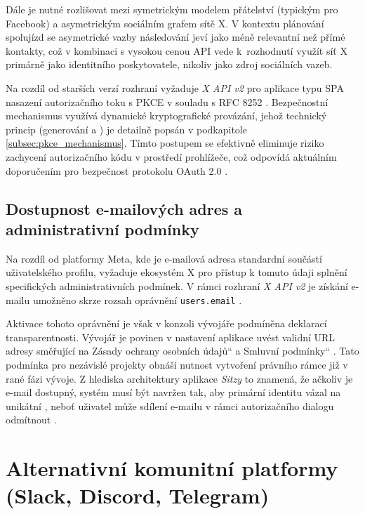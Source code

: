 \documentclass[male,czech,api_bc]{kitheses}
\newcommand{\UV}[1]{\quotedblbase#1\textquotedblleft}
\begin{document}
Dále je nutné rozlišovat mezi symetrickým modelem přátelství (typickým pro Facebook) a asymetrickým sociálním grafem sítě X. V kontextu plánování spolujízd se asymetrické vazby následování jeví jako méně relevantní než přímé kontakty, což v kombinaci s vysokou cenou API vede k~rozhodnutí využít síť X primárně jako identitního poskytovatele, nikoliv jako zdroj sociálních vazeb.

Na rozdíl od starších verzí rozhraní vyžaduje \textit{X API v2} pro aplikace typu SPA nasazení autorizačního toku s PKCE v souladu s RFC 8252 \cite{Denniss2017}. Bezpečnostní mechanismus využívá dynamické kryptografické provázání, jehož technický princip (generování  a ) je detailně popsán v podkapitole \vref{subsec:pkce_mechanismus}. Tímto postupem se efektivně eliminuje riziko zachycení autorizačního kódu v prostředí prohlížeče, což odpovídá aktuálním doporučením pro bezpečnost protokolu OAuth 2.0 \cite{SakimuraEd2015,Lodderstedt2025}.

\subsection{Dostupnost e-mailových adres a administrativní podmínky}

Na rozdíl od platformy Meta, kde je e-mailová adresa standardní součástí uživatelského profilu, vyžaduje ekosystém X pro přístup k tomuto údaji splnění specifických administrativních podmínek. V rámci rozhraní \textit{X API v2} je získání e-mailu umožněno skrze rozsah oprávnění \texttt{users.email} \cite{XDev2026}.

Aktivace tohoto oprávnění je však v konzoli vývojáře podmíněna deklarací transparentnosti. Vývojář je povinen v nastavení aplikace uvést validní URL adresy směřující na \UV{Zásady ochrany osobních údajů} a \UV{Smluvní podmínky} \cite{XDev2026}. Tato podmínka pro nezávislé projekty obnáší nutnost vytvoření právního rámce již v rané fázi vývoje. Z hlediska architektury aplikace \textit{Sitzy} to znamená, že ačkoliv je e-mail dostupný, systém musí být navržen tak, aby primární identitu vázal na unikátní , neboť uživatel může sdílení e-mailu v rámci autorizačního dialogu odmítnout \cite{XAPI20251110}.

\section{Alternativní komunitní platformy (Slack, Discord, Telegram)}
\end{document}
